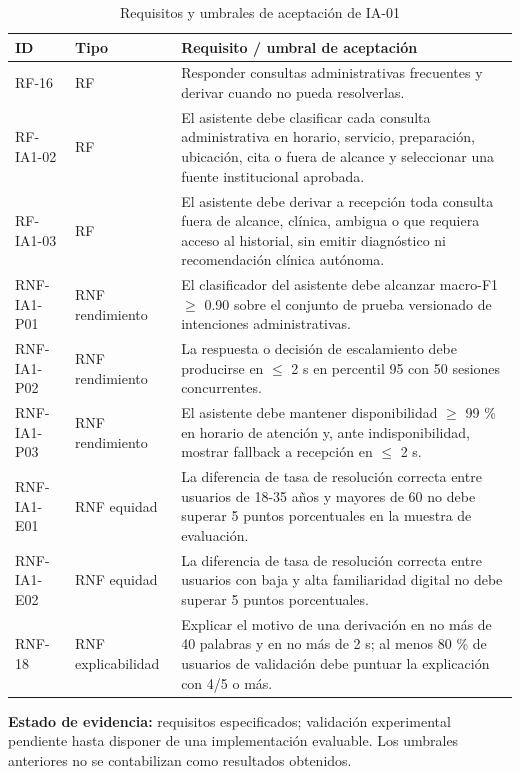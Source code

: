 \documentclass[11pt,a4paper]{article}
\begin{document}
	\begin{longtable}{p{2.5cm}p{3.4cm}p{9.8cm}}
		\caption{Requisitos y umbrales de aceptación de IA-01}\\\toprule\textbf{ID}&\textbf{Tipo}&\textbf{Requisito / umbral de aceptación}\\\midrule\endhead
		RF-16&RF&Responder consultas administrativas frecuentes y derivar cuando no pueda resolverlas.\\
		RF-IA1-02 & RF & El asistente debe clasificar cada consulta administrativa en horario, servicio, preparación, ubicación, cita o fuera de alcance y seleccionar una fuente institucional aprobada. \\
		RF-IA1-03 & RF & El asistente debe derivar a recepción toda consulta fuera de alcance, clínica, ambigua o que requiera acceso al historial, sin emitir diagnóstico ni recomendación clínica autónoma. \\
		RNF-IA1-P01 & RNF rendimiento & El clasificador del asistente debe alcanzar macro-F1 $\geq$ 0.90 sobre el conjunto de prueba versionado de intenciones administrativas. \\
		RNF-IA1-P02 & RNF rendimiento & La respuesta o decisión de escalamiento debe producirse en $\leq$ 2 s en percentil 95 con 50 sesiones concurrentes. \\
		RNF-IA1-P03 & RNF rendimiento & El asistente debe mantener disponibilidad $\geq$ 99 \% en horario de atención y, ante indisponibilidad, mostrar fallback a recepción en $\leq$ 2 s. \\
		RNF-IA1-E01 & RNF equidad & La diferencia de tasa de resolución correcta entre usuarios de 18-35 años y mayores de 60 no debe superar 5 puntos porcentuales en la muestra de evaluación. \\
		RNF-IA1-E02 & RNF equidad & La diferencia de tasa de resolución correcta entre usuarios con baja y alta familiaridad digital no debe superar 5 puntos porcentuales. \\
		RNF-18&RNF explicabilidad&Explicar el motivo de una derivación en no más de 40 palabras y en no más de 2 s; al menos 80 \% de usuarios de validación debe puntuar la explicación con 4/5 o más.\\\bottomrule\end{longtable}
	
	\textbf{Estado de evidencia:} requisitos especificados; validación experimental pendiente hasta disponer de una implementación evaluable. Los umbrales anteriores no se contabilizan como resultados obtenidos.
	
\end{document}
